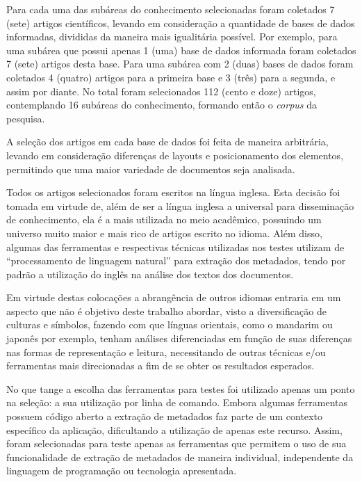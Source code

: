 Para cada uma das subáreas do conhecimento selecionadas foram coletados 7 (sete) artigos científicos, levando em consideração a quantidade de bases de dados informadas, divididas da maneira mais igualitária possível. Por exemplo, para uma subárea que possui apenas 1 (uma) base de dados informada foram coletados 7 (sete) artigos desta base. Para uma subárea com 2 (duas) bases de dados foram coletados 4 (quatro) artigos para a primeira base e 3 (três) para a segunda, e assim por diante. No total foram selecionados 112 (cento e doze) artigos, contemplando 16 subáreas do conhecimento, formando então o \emph{corpus} da pesquisa.

A seleção dos artigos em cada base de dados foi feita de maneira arbitrária, levando em consideração diferenças de layouts e posicionamento dos elementos, permitindo que uma maior variedade de documentos seja analisada.


Todos os artigos selecionados foram escritos na língua inglesa. Esta decisão foi tomada em virtude de, além de ser a língua inglesa a universal para disseminação de conhecimento, ela é a mais utilizada no meio acadêmico, possuindo um universo muito maior e mais rico de artigos escrito no idioma. Além disso, algumas das ferramentas e respectivas técnicas utilizadas nos testes utilizam de ``processamento de linguagem natural'' para extração dos metadados, tendo por padrão a utilização do inglês na análise dos textos dos documentos.

Em virtude destas colocações a abrangência de outros idiomas entraria em um aspecto que não é objetivo deste trabalho abordar, visto a diversificação de culturas e símbolos, fazendo com que línguas orientais, como o mandarim ou japonês por exemplo, tenham análises diferenciadas em função de suas diferenças nas formas de representação e leitura, necessitando de outras técnicas e/ou ferramentas mais direcionadas a fim de se obter os resultados esperados.

No que tange a escolha das ferramentas para testes foi utilizado apenas um ponto na seleção: a sua utilização por linha de comando. Embora algumas ferramentas possuem código aberto a extração de metadados faz parte de um contexto específico da aplicação, dificultando a utilização de apenas este recurso. Assim, foram selecionadas para teste apenas as ferramentas que permitem o uso de sua funcionalidade de extração de metadados de maneira individual, independente da linguagem de programação ou tecnologia apresentada. 

